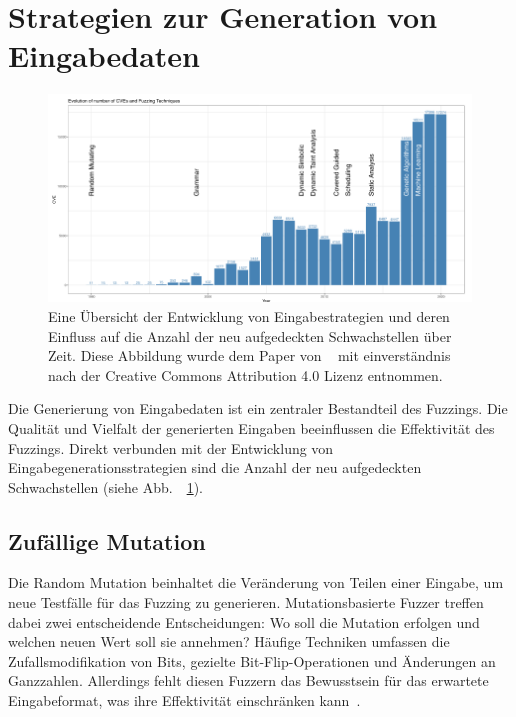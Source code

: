 \section{Strategien zur Generation von Eingabedaten}\label{sec:strategien-von-fuzzern-zur-eingabegenerierung}
\begin{figure}[ht]
    \centering
    \includegraphics[width=\textwidth]{res/entwicklung_der_eingabestrategien}
    \caption{Eine Übersicht der Entwicklung von Eingabestrategien und deren Einfluss auf die Anzahl der neu aufgedeckten Schwachstellen
    über Zeit.
    Diese Abbildung wurde dem Paper von ~\citet{eceiza_fuzzing_2021} mit einverständnis nach der Creative Commons Attribution 4.0 Lizenz entnommen.}
    \label{fig:eingabestrategien}
\end{figure}
Die Generierung von Eingabedaten ist ein zentraler Bestandteil des Fuzzings.
Die Qualität und Vielfalt der generierten Eingaben beeinflussen die Effektivität des Fuzzings.
Direkt verbunden mit der Entwicklung von Eingabegenerationsstrategien sind die Anzahl der neu aufgedeckten Schwachstellen (siehe Abb.\ ~\ref{fig:eingabestrategien}).
\subsection{Zufällige Mutation}\label{subsec:zufallige-mutation}
Die Random Mutation beinhaltet die Veränderung von Teilen einer Eingabe, um neue Testfälle für das
Fuzzing zu generieren.
Mutationsbasierte Fuzzer treffen dabei zwei entscheidende Entscheidungen: Wo soll die Mutation erfolgen und welchen neuen
Wert soll sie annehmen?
Häufige Techniken umfassen die Zufallsmodifikation von Bits, gezielte Bit-Flip-Operationen und Änderungen an Ganzzahlen.
Allerdings fehlt diesen Fuzzern das Bewusstsein für das erwartete Eingabeformat, was ihre Effektivität einschränken kann~\cite{saavedra_review_2019}.
